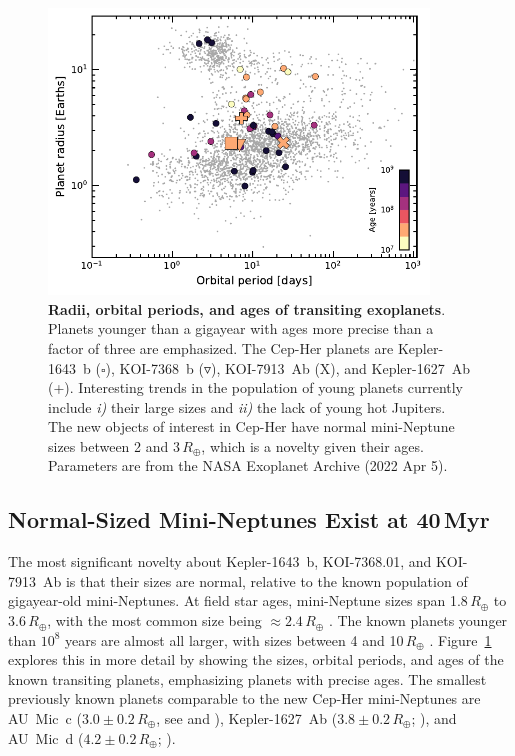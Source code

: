 \documentclass[12pt,twocolumn]{aastex63}
\begin{document}
\begin{figure}[!t]
	\begin{center}
		\leavevmode
		\includegraphics[width=0.9\textwidth]{f4.pdf}
	\end{center}
	\vspace{-0.6cm}
	\caption{
		{\bf Radii, orbital periods, and ages of transiting exoplanets}.
    Planets younger than a gigayear with ages more precise than a factor of
    three are emphasized. The Cep-Her planets are
    Kepler-1643~b ($\square$), KOI-7368~b ($\triangledown$),
    KOI-7913~Ab (X), and Kepler-1627~Ab (+).  
    Interesting trends in the population of young planets currently include
    {\it i)} their large sizes 
    and {\it ii)} the lack of young hot Jupiters.
    The new objects of interest in Cep-Her have normal mini-Neptune sizes
    between 2 and 3\,$R_\oplus$, which is a novelty given their ages.
    Parameters are from the NASA Exoplanet Archive (2022 Apr 5).
		\label{fig:rp_period_age}
	}
\end{figure}


\subsection{Normal-Sized Mini-Neptunes Exist at 40$\,$Myr}
\label{subsec:sizes}

The most significant novelty about
Kepler-1643~b, KOI-7368.01, and KOI-7913~Ab is that their sizes are
normal, relative to the known population of gigayear-old
mini-Neptunes.  At field star ages, mini-Neptune sizes span
1.8\,$R_\oplus$ to 3.6\,$R_\oplus$, with the most
common size being $\approx 2.4\,R_\oplus$
\citep[][Figure~7]{Fulton_et_al_2017}.  The known planets younger than
$10^8$ years are almost all larger, with sizes between 4 and
10$\,R_\oplus$
\citep{Mann_K2_33b_2016,David_et_al_2017,benatti_possibly_2019,david_four_2019,newton_tess_2019,rizzuto_tess_2020,bouma_cluster_2020,mann_toi1227_2022}.
Figure~\ref{fig:rp_period_age} explores this in more detail by showing
the sizes, orbital periods, and ages of the known transiting planets,
emphasizing planets with precise ages.  The smallest previously known planets
comparable to the new Cep-Her mini-Neptunes
are AU~Mic~c ($3.0\pm0.2\,R_\oplus$, see
\citealt{martioli_aumicbc_2021} and \citealt{gilbert_flares_2022}),
Kepler-1627~Ab ($3.8\pm0.2\,R_\oplus$; \citealt{bouma_kep1627_2022}),
and AU~Mic~d ($4.2\pm0.2\,R_\oplus$; \citealt{plavchan_planet_2020}).
\end{document}

